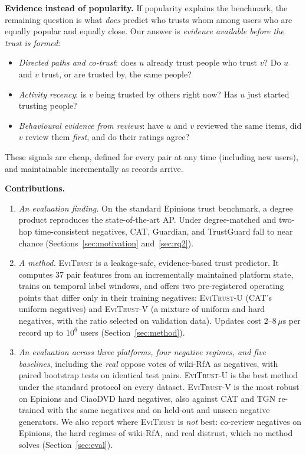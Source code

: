 \documentclass[conference]{IEEEtran}
\newcommand{\evi}{\textsc{EviTrust}}
\newcommand{\eviU}{\textsc{EviTrust}-U}
\newcommand{\eviV}{\textsc{EviTrust}-V}
\begin{document}
\textbf{Evidence instead of popularity.} If popularity explains the benchmark, the remaining question is what \emph{does} predict who trusts whom among users who are equally popular and equally close. Our answer is \emph{evidence available before the trust is formed}:
\begin{itemize}
\item \emph{Directed paths and co-trust}: does $u$ already trust people who trust $v$? Do $u$ and $v$ trust, or are trusted by, the same people?
\item \emph{Activity recency}: is $v$ being trusted by others right now? Has $u$ just started trusting people?
\item \emph{Behavioural evidence from reviews}: have $u$ and $v$ reviewed the same items, did $v$ review them \emph{first}, and do their ratings agree?
\end{itemize}
These signals are cheap, defined for every pair at any time (including new users), and maintainable incrementally as records arrive.

\textbf{Contributions.}
\begin{enumerate}
\item \emph{An evaluation finding.} On the standard Epinions trust benchmark, a degree product reproduces the state-of-the-art AP. Under degree-matched and two-hop time-consistent negatives, CAT, Guardian, and TrustGuard fall to near chance (Sections~\ref{sec:motivation} and~\ref{sec:rq2}).
\item \emph{A method.} \evi{} is a leakage-safe, evidence-based trust predictor. It computes 37 pair features from an incrementally maintained platform state, trains on temporal label windows, and offers two pre-registered operating points that differ only in their training negatives: \eviU{} (CAT's uniform negatives) and \eviV{} (a mixture of uniform and hard negatives, with the ratio selected on validation data). Updates cost 2--8\,$\mu$s per record up to $10^6$ users (Section~\ref{sec:method}).
\item \emph{An evaluation across three platforms, four negative regimes, and five baselines}, including the \emph{real} oppose votes of wiki-RfA as negatives, with paired bootstrap tests on identical test pairs. \eviU{} is the best method under the standard protocol on every dataset. \eviV{} is the most robust on Epinions and CiaoDVD hard negatives, also against CAT and TGN re-trained with the same negatives and on held-out and unseen negative generators. We also report where \evi{} is \emph{not} best: co-review negatives on Epinions, the hard regimes of wiki-RfA, and real distrust, which no method solves (Section~\ref{sec:eval}).
\end{enumerate}
\end{document}
